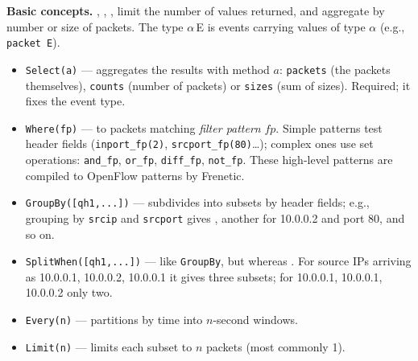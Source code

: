 \textbf{Basic concepts.} , , , limit the number of values returned, and aggregate by number or size of packets.  The type $\alpha$\,\textsf{E} is events carrying values of type $\alpha$ (e.g., \texttt{packet E}).
\begin{itemize}
\item \texttt{Select(a)} --- aggregates the results with method $a$: \texttt{packets} (the packets themselves), \texttt{counts} (number of packets) or \texttt{sizes} (sum of sizes). Required; it fixes the event type.
\item \texttt{Where(fp)} ---  to packets matching \emph{filter pattern} $fp$. Simple patterns test header fields (\texttt{inport\_fp(2)}, \texttt{srcport\_fp(80)}\ldots); complex ones use set operations: \texttt{and\_fp}, \texttt{or\_fp}, \texttt{diff\_fp}, \texttt{not\_fp}. These high-level patterns are compiled to OpenFlow patterns by Frenetic.
\item \texttt{GroupBy([qh1,...])} --- subdivides into subsets by header fields; e.g., grouping by \texttt{srcip} and \texttt{srcport} gives , another for 10.0.0.2 and port 80, and so on.
\item \texttt{SplitWhen([qh1,...])} --- like \texttt{GroupBy}, but whereas . For source IPs arriving as 10.0.0.1, 10.0.0.2, 10.0.0.1 it gives three subsets; for 10.0.0.1, 10.0.0.1, 10.0.0.2 only two.
\item \texttt{Every(n)} --- partitions by time into $n$-second windows.
\item \texttt{Limit(n)} --- limits each subset to $n$ packets (most commonly 1).
\end{itemize}

